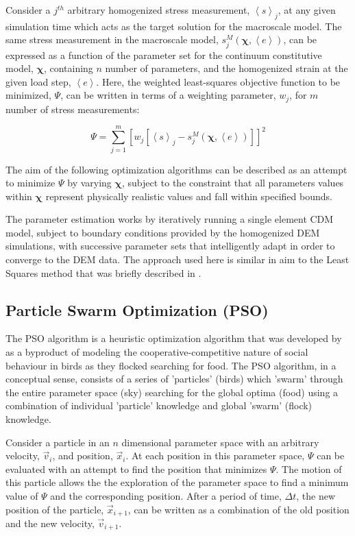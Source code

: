 Consider a $j^{th}$ arbitrary homogenized stress measurement, $\left< s \right>_j$,  at any given simulation time which acts as the target solution for the macroscale model. The same stress measurement in the macroscale model, $s^M_j \left(\boldsymbol{\chi}, \left< e \right>\right)$, can be expressed as a function of the parameter set for the continuum constitutive model, $\boldsymbol{\chi}$, containing $n$ number of parameters, and the homogenized strain at the given load step, $\left< e \right>$. Here, the weighted least-squares objective function to be minimized, $\Psi$, can be written in terms of a weighting parameter, $w_j$, for $m$ number of stress measurements:

\begin{equation}
\Psi=\sum_{j=1}^m\left[w_j\left[\left< s \right>_j-s^M_j \left(\boldsymbol{\chi}, \left< e \right>\right)\right]\right]^2
\label{eqn:lma2}
\end{equation}

The aim of the following optimization algorithms can be described as an attempt to minimize $\Psi$ by varying $\boldsymbol{\chi}$, subject to the constraint that all parameters values within $\boldsymbol{\chi}$ represent physically realistic values and fall within specified bounds.

The parameter estimation works by iteratively running a single element CDM model, subject to boundary conditions provided by the homogenized DEM simulations, with successive parameter sets that intelligently adapt in order to converge to the DEM data. The approach used here is similar in aim to the Least Squares method that was briefly described in \citet{marquardt_algorithm_1963}.

\subsection{Particle Swarm Optimization (PSO)}

The PSO algorithm is a heuristic optimization algorithm that was developed by \citet{Kennedy} as a byproduct of modeling the cooperative-competitive nature of social behaviour in birds as they flocked searching for food. The PSO algorithm, in a conceptual sense, consists of a series of 'particles' (birds) which 'swarm' through the entire parameter space (sky) searching for the global optima (food) using a combination of individual 'particle' knowledge and global 'swarm' (flock) knowledge.

Consider a particle in an $n$ dimensional parameter space with an arbitrary velocity, $\vec{v}_i$, and position, $\vec{x}_i$. At each position in this parameter space, $\Psi$ can be evaluated with an attempt to find the position that minimizes $\Psi$. The motion of this particle allows the the exploration of the parameter space to find a minimum value of $\Psi$ and the corresponding position. After a period of time, $\Delta t$, the new position of the particle, $\vec{x}_{i+1}$, can be written as a combination of the old position and the new velocity, $\vec{v}_{i+1}$. 

